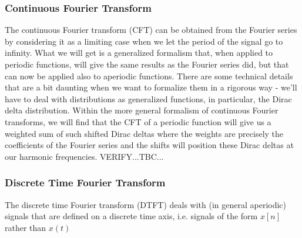 






\subsubsection{Continuous Fourier Transform}
The continuous Fourier transform (CFT) can be obtained from the Fourier series by considering it as a limiting case when we let the period of the signal go to infinity. What we will get is a generalized formalism that, when applied to periodic functions, will give the same results as the Fourier series did, but that can now be applied also to aperiodic functions. There are some technical details that are a bit daunting when we want to formalize them in a rigorous way - we'll have to deal with distributions as generalized functions, in particular, the Dirac delta distribution. Within the more general formalism of continuous Fourier transforms, we will find that the CFT of a periodic function will give us a weighted sum of such shifted Dirac deltas where the weights are precisely the coefficients of the Fourier series and the shifts will position these Dirac deltas at our harmonic frequencies. VERIFY...TBC...




\subsubsection{Discrete Time Fourier Transform}
The discrete time Fourier transform (DTFT) deals with (in general aperiodic) signals that are defined on a discrete time axis, i.e. signals of the form $x[n]$ rather than $x(t)$


